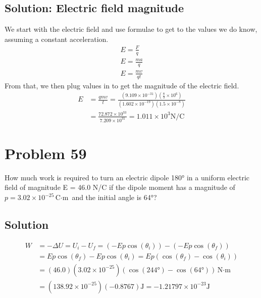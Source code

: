 \documentclass[12pt]{article}
\begin{document}
\subsection{Solution: Electric field magnitude}
We start with the electric field and use formulae to get to the values we do know, assuming a constant acceleration.
\begin{gather*}
    E = \frac{F}{q}\\
    E = \frac{ma}{q}\\
    E = \frac{mv}{qt}
\end{gather*}
From that, we then plug values in to get the magnitude of the electric field.
\begin{align*}
    E   &=  \frac{qmv}{t}
        =   \frac{(9.109 \times 10^{-31})(\frac{8}{3} \times 10^6)}{(1.602 \times 10^{-19})(1.5 \times 10^{-8})}\\
        &=  \frac{72.872 \times 10^{33}}{7.209 \times 10^{31}}
        =   \boxed{1.011 \times 10^3 \unit{\newton/\coulomb}}
\end{align*}

\pagebreak
\section{Problem 59}
How much work is required to turn an electric dipole 180\unit{\degree} in a uniform electric field of magnitude E = 46.0 N/C if the dipole moment has a magnitude of $p = 3.02 \times 10^{-25} \unit{\coulomb\cdot\meter}$ and the initial angle is 64\unit{\degree}?

\subsection*{Solution}
\begin{align*}
    W   &=  -\Delta U
        =   U_i - U_f
        =   (-Ep\cos(\theta_i)) - (-Ep\cos(\theta_f))\\
        &=  Ep\cos(\theta_f) - Ep\cos(\theta_i)
        =   Ep(\cos(\theta_f) - \cos(\theta_i))\\
        &=  (46.0)(3.02 \times 10^{-25})(\cos(244 \unit{\degree}) - \cos(64 \unit{\degree})) \unit{\newton\cdot\meter}\\
        &=  (138.92 \times 10^{-25})(-0.8767) \unit{\joule}
        =   \boxed{-1.21797 \times 10^{-23} \unit{\joule}}
\end{align*}

\pagebreak
\end{document}
